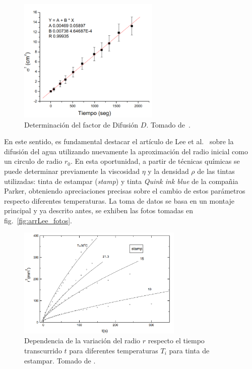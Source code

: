 \documentclass[11pt]{article}
\begin{document}
\begin{figure}[H]
    \centering
    \includegraphics[width=0.6\textwidth]{figs/arrBianchi_plotGaussiano.png}
    \caption{Determinación del factor de Difusión $D$. Tomado de~\cite{micaelaDifusionKMnO4Agua2006}. }
    \label{fig:bianchi_plot_D}
\end{figure}

En este sentido, es fundamental destacar el artículo de Lee et al.~\cite{leeInkDifussionWater2004} sobre la difusión del agua utilizando nuevamente la aproximación del radio inicial como un circulo de radio $r_0$. En esta oportunidad, a partir de técnicas químicas se puede determinar previamente la viscosidad $\eta$ y la densidad $\rho$ de las tintas utilizadas: tinta de estampar (\textit{stamp}) y tinta \textit{Quink ink blue} de la compañia Parker, obteniendo apreciaciones precisas sobre el cambio de estos parámetros respecto diferentes temperaturas. La toma de datos se basa en un montaje principal y ya descrito antes, se exhiben las fotos tomadas en fig.~\ref{fig:arrLee_fotos}.
\begin{figure}[htp]
    \centering
    \includegraphics[width=0.7\textwidth]{figs/arrLee_plotStamp.png}
    \caption{Dependencia de la variación del radio $r$ respecto el tiempo transcurrido $t$ para diferentes temperaturas $T_i$ para tinta de estampar. Tomado de \cite{leeInkDifussionWater2004}.}
    \label{fig:arrLee_plot_stamp}
\end{figure}
\end{document}
